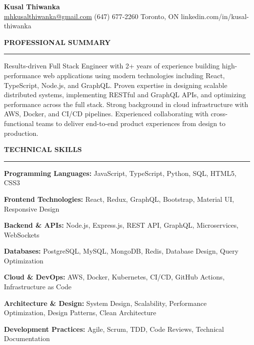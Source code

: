 \documentclass[10pt,letterpaper]{article}
\begin{document}
\begin{center}
{\LARGE\textbf{Kusal Thiwanka}}\\[3pt]
\href{mailto:mhkusalthiwanka@gmail.com}{mhkusalthiwanka@gmail.com}\hspace{2em}%
(647) 677{-}2260\hspace{2em}%
Toronto, ON\hspace{2em}
linkedin.com/in/kusal-thiwanka
\end{center}

\vspace{6pt}

\textbf{PROFESSIONAL SUMMARY}\\[-8pt]
\noindent\rule{\textwidth}{1pt}

\vspace{-2pt}

Results-driven Full Stack Engineer with 2+ years of experience building high-performance web applications using modern technologies including React, TypeScript, Node.js, and GraphQL. Proven expertise in designing scalable distributed systems, implementing RESTful and GraphQL APIs, and optimizing performance across the full stack. Strong background in cloud infrastructure with AWS, Docker, and CI/CD pipelines. Experienced collaborating with cross-functional teams to deliver end-to-end product experiences from design to production.

\vspace{8pt}

\textbf{TECHNICAL SKILLS}\\[-8pt]
\noindent\rule{\textwidth}{1pt}

\vspace{-2pt}

\textbf{Programming Languages:} JavaScript, TypeScript, Python, SQL, HTML5, CSS3

\textbf{Frontend Technologies:} React, Redux, GraphQL, Bootstrap, Material UI, Responsive Design

\textbf{Backend \& APIs:} Node.js, Express.js, REST API, GraphQL, Microservices, WebSockets

\textbf{Databases:} PostgreSQL, MySQL, MongoDB, Redis, Database Design, Query Optimization

\textbf{Cloud \& DevOps:} AWS, Docker, Kubernetes, CI/CD, GitHub Actions, Infrastructure as Code

\textbf{Architecture \& Design:} System Design, Scalability, Performance Optimization, Design Patterns, Clean Architecture

\textbf{Development Practices:} Agile, Scrum, TDD, Code Reviews, Technical Documentation
\end{document}
